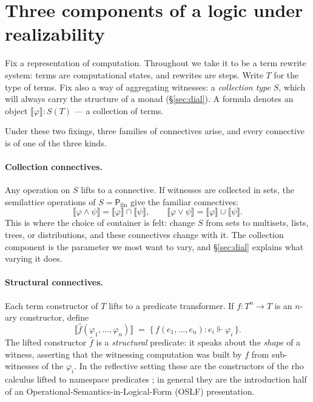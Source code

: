 \documentclass[11pt]{article}
\theoremstyle{definition}
\theoremstyle{plain}
\newcommand{\T}{T}
\newcommand{\Coll}{S}
\newcommand{\Pfin}{\mathsf{P}_{\mathrm{fin}}}
\newcommand{\sem}[1]{\llbracket #1 \rrbracket}
\newcommand{\real}{\Vdash}
\newcommand{\op}[1]{\widehat{#1}}
\begin{document}
\section{Three components of a logic under realizability}
\label{sec:three}

Fix a representation of computation. Throughout we take it to be a term
rewrite system: terms are computational states, and rewrites are steps. Write
$\T$ for the type of terms. Fix also a way of aggregating witnesses: a
\emph{collection type} $\Coll$, which will always carry the structure of a
monad (\S\ref{sec:dial}). A formula denotes an object $\sem{\varphi} :
\Coll(\T)$ --- a collection of terms.

Under these two fixings, three families of connectives arise, and every
connective is of one of the three kinds.

\paragraph{Collection connectives.}
Any operation on $\Coll$ lifts to a connective. If witnesses are collected in
sets, the semilattice operations of $\Coll = \Pfin$ give the familiar
connectives:
\[
  \sem{\varphi \wedge \psi} = \sem{\varphi} \cap \sem{\psi},
  \qquad
  \sem{\varphi \vee \psi} = \sem{\varphi} \cup \sem{\psi}.
\]
This is where the choice of container is felt: change $\Coll$ from sets to
multisets, lists, trees, or distributions, and these connectives change with
it. The collection component is the parameter we most want to vary, and
\S\ref{sec:dial} explains what varying it does.

\paragraph{Structural connectives.}
Each term constructor of $\T$ lifts to a predicate transformer. If
$f : \T^{n} \to \T$ is an $n$-ary constructor, define
\[
  \sem{\op{f}(\varphi_{1},\dots,\varphi_{n})}
  \;=\;
  \{\, f(e_{1},\dots,e_{n}) : e_{i} \real \varphi_{i} \,\}.
\]
The lifted constructor $\op{f}$ is a \emph{structural} predicate: it speaks
about the \emph{shape} of a witness, asserting that the witnessing computation
was built by $f$ from sub-witnesses of the $\varphi_{i}$. In the reflective
setting these are the constructors of the rho calculus lifted to namespace
predicates \cite{MeredithRadestock05a,MeredithRadestock05b}; in general they
are the introduction half of an Operational-Semantics-in-Logical-Form (OSLF)
presentation.
\end{document}
